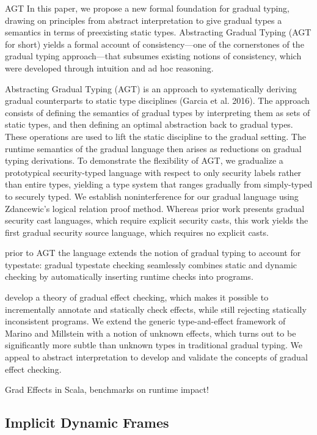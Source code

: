 \cite{garcia2016abstracting}
AGT
In this paper, we propose a new formal foundation for gradual
typing, drawing on principles from abstract interpretation to
give gradual types a semantics in terms of preexisting static types.
Abstracting Gradual Typing (AGT for short) yields a formal account
of consistency—one of the cornerstones of the gradual typing
approach—that subsumes existing notions of consistency, which
were developed through intuition and ad hoc reasoning.

\cite{garcia2015deriving}
Abstracting Gradual Typing (AGT) is an approach to systematically
deriving gradual counterparts to static type disciplines (Garcia
et al. 2016). The approach consists of defining the semantics of
gradual types by interpreting them as sets of static types, and then
defining an optimal abstraction back to gradual types. These operations
are used to lift the static discipline to the gradual setting. The
runtime semantics of the gradual language then arises as reductions
on gradual typing derivations.
To demonstrate the flexibility of AGT, we gradualize
a prototypical security-typed language
with respect to only security labels rather than entire types, yielding
a type system that ranges gradually from simply-typed to securely typed.
We establish noninterference for our gradual language using Zdancewic’s logical relation proof method.
Whereas prior work presents gradual security cast languages,
which require explicit security casts, this work yields the first gradual
security source language, which requires no explicit casts.

prior to AGT
\cite{wolff2011gradual}
the language extends the notion of gradual typing to account for typestate: gradual typestate
checking seamlessly combines static and dynamic checking by automatically
inserting runtime checks into programs.

\cite{banados2014theory}
 develop a theory of gradual effect checking, which
 makes it possible to incrementally annotate and statically check
 effects, while still rejecting statically inconsistent programs. We
 extend the generic type-and-effect framework of Marino and Millstein
 with a notion of unknown effects, which turns out to be significantly
 more subtle than unknown types in traditional gradual
 typing. We appeal to abstract interpretation to develop and validate
 the concepts of gradual effect checking.

\cite{toro2015customizable}
Grad Effects in Scala, benchmarks on runtime impact!

\subsection{Implicit Dynamic Frames}


